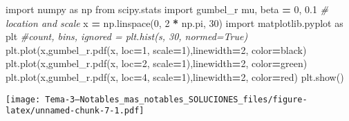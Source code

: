 \documentclass[
]{article}
\newenvironment{Shaded}{\begin{snugshade}}{\end{snugshade}}
\newcommand{\CommentTok}[1]{\textcolor[rgb]{0.56,0.35,0.01}{\textit{#1}}}
\newcommand{\DecValTok}[1]{\textcolor[rgb]{0.00,0.00,0.81}{#1}}
\newcommand{\FloatTok}[1]{\textcolor[rgb]{0.00,0.00,0.81}{#1}}
\newcommand{\ImportTok}[1]{#1}
\newcommand{\NormalTok}[1]{#1}
\newcommand{\OperatorTok}[1]{\textcolor[rgb]{0.81,0.36,0.00}{\textbf{#1}}}
\newcommand{\StringTok}[1]{\textcolor[rgb]{0.31,0.60,0.02}{#1}}
\begin{document}
\begin{Shaded}
\begin{Highlighting}[]
\ImportTok{import}\NormalTok{ numpy }\ImportTok{as}\NormalTok{ np }
\ImportTok{from}\NormalTok{ scipy.stats }\ImportTok{import}\NormalTok{ gumbel\_r}
\NormalTok{mu, beta }\OperatorTok{=} \DecValTok{0}\NormalTok{, }\FloatTok{0.1} \CommentTok{\# location and scale}
\NormalTok{x }\OperatorTok{=}\NormalTok{ np.linspace(}\DecValTok{0}\NormalTok{, }\DecValTok{2} \OperatorTok{*}\NormalTok{ np.pi, }\DecValTok{30}\NormalTok{)}
\ImportTok{import}\NormalTok{ matplotlib.pyplot }\ImportTok{as}\NormalTok{ plt}
\CommentTok{\#count, bins, ignored = plt.hist(s, 30, normed=True)}
\NormalTok{plt.plot(x,gumbel\_r.pdf(x, loc}\OperatorTok{=}\DecValTok{1}\NormalTok{, scale}\OperatorTok{=}\DecValTok{1}\NormalTok{),linewidth}\OperatorTok{=}\DecValTok{2}\NormalTok{, color}\OperatorTok{=}\StringTok{\textquotesingle{}black\textquotesingle{}}\NormalTok{)}
\NormalTok{plt.plot(x,gumbel\_r.pdf(x, loc}\OperatorTok{=}\DecValTok{2}\NormalTok{, scale}\OperatorTok{=}\DecValTok{1}\NormalTok{),linewidth}\OperatorTok{=}\DecValTok{2}\NormalTok{, color}\OperatorTok{=}\StringTok{\textquotesingle{}green\textquotesingle{}}\NormalTok{)}
\NormalTok{plt.plot(x,gumbel\_r.pdf(x, loc}\OperatorTok{=}\DecValTok{4}\NormalTok{, scale}\OperatorTok{=}\DecValTok{1}\NormalTok{),linewidth}\OperatorTok{=}\DecValTok{2}\NormalTok{, color}\OperatorTok{=}\StringTok{\textquotesingle{}red\textquotesingle{}}\NormalTok{)}
\NormalTok{plt.show()}
\end{Highlighting}
\end{Shaded}

\texttt{[image: Tema-3---Notables\_mas\_notables\_SOLUCIONES\_files/figure-latex/unnamed-chunk-7-1.pdf]}
\end{document}
